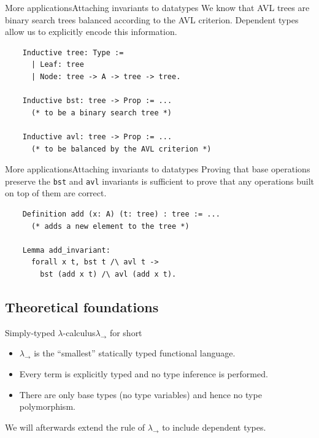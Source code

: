 \documentclass[serif, xcolor={svgnames, table}, usepdftitle=false]{beamer}
\begin{document}
\begin{frame}[fragile]{More applications}{Attaching invariants to
    datatypes}
  We know that AVL trees are binary search trees balanced according to
  the AVL criterion.  Dependent types allow us to explicitly encode
  this information.
  \begin{verbatim}
    Inductive tree: Type :=
      | Leaf: tree
      | Node: tree -> A -> tree -> tree.

    Inductive bst: tree -> Prop := ...
      (* to be a binary search tree *)

    Inductive avl: tree -> Prop := ...
      (* to be balanced by the AVL criterion *)
  \end{verbatim}
\end{frame}

\begin{frame}[fragile]{More applications}{Attaching invariants to
    datatypes}
  Proving that base operations preserve the \texttt{bst} and
  \texttt{avl} invariants is sufficient to prove that any
  operations built on top of them are correct.

  \begin{verbatim}
    Definition add (x: A) (t: tree) : tree := ...
      (* adds a new element to the tree *)

    Lemma add_invariant:
      forall x t, bst t /\ avl t ->
        bst (add x t) /\ avl (add x t).
  \end{verbatim}
\end{frame}

\subsection{Theoretical foundations}

\begin{frame}{Simply-typed \(\lambda\)-calculus}{\(\lambda_{\to}\) for
  short}
  \begin{itemize}
  \item \(\lambda_{\to}\) is the ``smallest'' statically typed
    functional language.
  \item Every term is explicitly typed and no type inference is
    performed.
  \item There are only base types (no type variables) and hence no
    type polymorphism.
  \end{itemize}

  We will afterwards extend the rule of \(\lambda_{\to}\) to include
  dependent types.
\end{frame}
\end{document}
